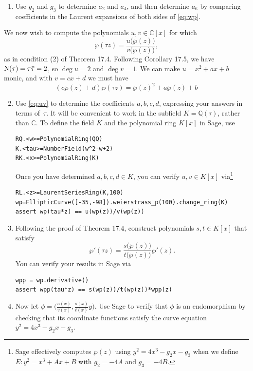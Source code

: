 \documentclass[11pt]{article}
\newcommand{\Q}{\mathbb{Q}}
\newcommand{\C}{\mathbb{C}}
\newcommand{\N}{{\rm N}}
\theoremstyle{definition}
\begin{document}
\begin{enumerate}[{\bf (a)}]
\item
Use $g_2$ and $g_3$ to determine $a_2$ and $a_4$, and then determine $a_6$ by comparing coefficients in the Laurent expansions of both sides of \eqref{eq:wp}.
\end{enumerate}
We now wish to compute the polynomials $u,v\in\C[x]$ for which
\[
\wp(\tau z)=\frac{u\bigl(\wp(z)\bigr)}{v\bigl(\wp(z)\bigr)},
\]
as in condition (2) of Theorem 17.4.
Following Corollary 17.5, we have $\N(\tau)=\tau\bar{\tau}=2$, so $\deg u=2$ and $\deg v=1$.
We can make $u=x^2+ax+b$ monic, and with $v=cx+d$ we must have
\begin{equation}\label{eq:uv}
(c\wp(z)+d)\wp(\tau z)=\wp(z)^2+a\wp(z)+b
\end{equation}
\begin{enumerate}[{\bf (a)}]
\setcounter{enumi}{1}
\item Use \eqref{eq:uv} to determine the coefficients $a,b,c,d$, expressing your answers in terms of~$\tau$.
It will be convenient to work in the subfield $K=\Q(\tau)$, rather than $\C$.  To define the field $K$ and the polynomial ring $K[x]$ in Sage, use
\begin{lstlisting}
RQ.<w>=PolynomialRing(QQ)
K.<tau>=NumberField(w^2-w+2)
RK.<x>=PolynomialRing(K)
\end{lstlisting}
Once you have determined $a,b,c,d\in K$, you can verify $u,v\in K[x]$ via\footnote{Sage effectively computes $\wp(z)$ using $y^2=4x^3-g_2x-g_3$ when we define $E\colon y^2=x^3+Ax+B$ with $g_2=-4A$ and $g_3=-4B$.}
\begin{lstlisting}
RL.<z>=LaurentSeriesRing(K,100)
wp=EllipticCurve([-35,-98]).weierstrass_p(100).change_ring(K)
assert wp(tau*z) == u(wp(z))/v(wp(z))
\end{lstlisting}
\item Following the proof of Theorem 17.4, construct polynomials $s,t\in K[x]$ that satisfy
\[
\wp'(\tau z) = \frac{s\bigl(\wp(z)\bigr)}{t\bigl(\wp(z)\bigr)}\wp'(z).
\]
You can verify your results in Sage via
\begin{lstlisting}
wpp = wp.derivative()
assert wpp(tau*z) == s(wp(z))/t(wp(z))*wpp(z)
\end{lstlisting}

\item Now let $\phi=\bigl(\frac{u(x)}{v(x)},\frac{s(x)}{t(x)}y\bigr)$.
Use Sage to verify that $\phi$ is an endomorphism by checking that its coordinate functions satisfy the curve equation $y^2=4x^3-g_2x-g_3$.
\end{enumerate}
\end{document}
